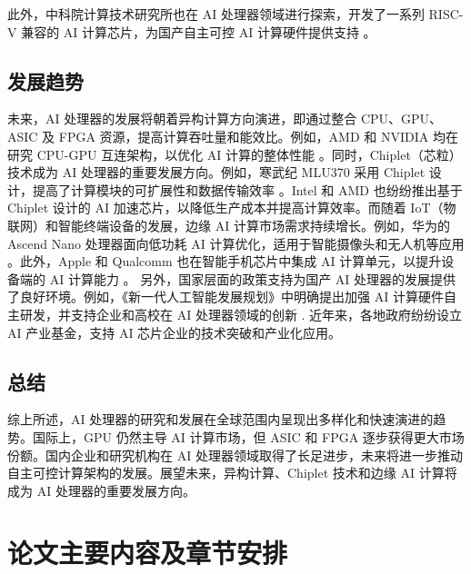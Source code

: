 此外，中科院计算技术研究所也在 AI 处理器领域进行探索，开发了一系列 RISC-V 兼容的 AI 计算芯片，为国产自主可控 AI 计算硬件提供支持 \cite{casic2022riscv}。



\subsection{发展趋势}
未来，AI 处理器的发展将朝着异构计算方向演进，即通过整合 CPU、GPU、ASIC 及 FPGA 资源，提高计算吞吐量和能效比。例如，AMD 和 NVIDIA 均在研究 CPU-GPU 互连架构，以优化 AI 计算的整体性能 \cite{amd2022chiplet}。同时，Chiplet（芯粒）技术成为 AI 处理器的重要发展方向。例如，寒武纪 MLU370 采用 Chiplet 设计，提高了计算模块的可扩展性和数据传输效率 \cite{cambricon2022mlu}。Intel 和 AMD 也纷纷推出基于 Chiplet 设计的 AI 加速芯片，以降低生产成本并提高计算效率。而随着 IoT（物联网）和智能终端设备的发展，边缘 AI 计算市场需求持续增长。例如，华为的 Ascend Nano 处理器面向低功耗 AI 计算优化，适用于智能摄像头和无人机等应用 \cite{huawei2022ascendnano}。此外，Apple 和 Qualcomm 也在智能手机芯片中集成 AI 计算单元，以提升设备端的 AI 计算能力 \cite{qualcomm2023snapdragon}。
另外，国家层面的政策支持为国产 AI 处理器的发展提供了良好环境。例如，《新一代人工智能发展规划》中明确提出加强 AI 计算硬件自主研发，并支持企业和高校在 AI 处理器领域的创新 \cite{china2017ai}. 近年来，各地政府纷纷设立 AI 产业基金，支持 AI 芯片企业的技术突破和产业化应用。

\subsection{总结}

综上所述，AI 处理器的研究和发展在全球范围内呈现出多样化和快速演进的趋势。国际上，GPU 仍然主导 AI 计算市场，但 ASIC 和 FPGA 逐步获得更大市场份额。国内企业和研究机构在 AI 处理器领域取得了长足进步，未来将进一步推动自主可控计算架构的发展。展望未来，异构计算、Chiplet 技术和边缘 AI 计算将成为 AI 处理器的重要发展方向。



\section{论文主要内容及章节安排}

